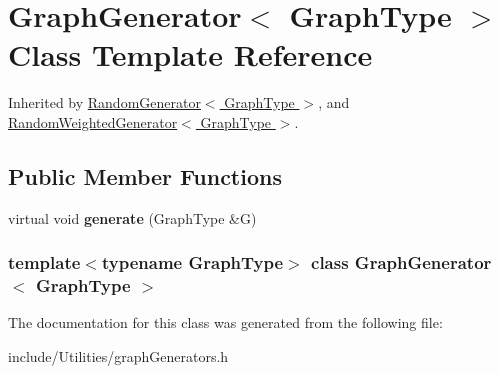 \hypertarget{class_graph_generator}{
\section{GraphGenerator$<$ GraphType $>$ Class Template Reference}
\label{class_graph_generator}
}


Inherited by \hyperlink{class_random_generator}{RandomGenerator$<$ GraphType $>$}, and \hyperlink{class_random_weighted_generator}{RandomWeightedGenerator$<$ GraphType $>$}.

\subsection*{Public Member Functions}
\begin{DoxyCompactItemize}
\item 
\hypertarget{class_graph_generator_a1fd83bc22f8ef6a6e8fb7488280c9a4a}{
virtual void {\bfseries generate} (GraphType \&G)}
\label{class_graph_generator_a1fd83bc22f8ef6a6e8fb7488280c9a4a}

\end{DoxyCompactItemize}
\subsubsection*{template$<$typename GraphType$>$ class GraphGenerator$<$ GraphType $>$}



The documentation for this class was generated from the following file:\begin{DoxyCompactItemize}
\item 
include/Utilities/graphGenerators.h\end{DoxyCompactItemize}
